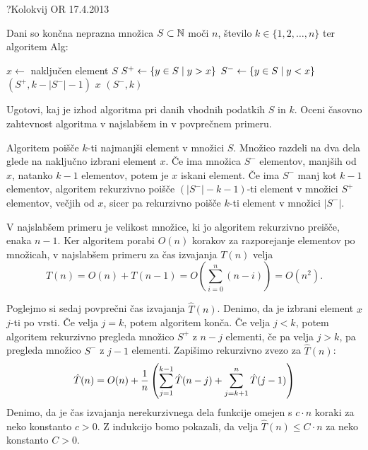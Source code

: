 \begin{naloga}{?}{Kolokvij OR 17.4.2013}
\begin{vprasanje}
Dani so končna neprazna množica $S \subset \mathbb{N}$ moči $n$,
število $k \in \{1, 2, \dots, n\}$ ter algoritem {\sc Alg}:
\begin{small}
\begin{algorithmic}
    \State $x \gets$ naključen element $S$
    \State $S^+ \gets \left\{ y \in S \; \middle| \; y > x \right\}$
    \State $S^- \gets \left\{ y \in S \; \middle| \; y < x \right\}$
        \State {}$(S^+, k - |S^-| - 1)$
        \State \Return $x$
    \Else
        \State {}$(S^-, k)$
    \EndIf
\EndFunction
\end{algorithmic}
\end{small}
Ugotovi, kaj je izhod algoritma pri danih vhodnih podatkih $S$ in $k$.
Oceni časovno zahtevnost algoritma v najslabšem in v povprečnem primeru.
\end{vprasanje}

\begin{odgovor}
Algoritem poišče $k$-ti najmanjši element v množici $S$.
Množico razdeli na dva dela glede na naključno izbrani element $x$.
Če ima množica $S^-$ elementov, manjših od $x$, natanko $k-1$ elementov,
potem je $x$ iskani element.
Če ima $S^-$ manj kot $k-1$ elementov,
algoritem rekurzivno poišče $(|S^-| - k - 1)$-ti element
v množici $S^+$ elementov, večjih od $x$,
sicer pa rekurzivno poišče $k$-ti element v množici $|S^-|$.

V najslabšem primeru je velikost množice,
ki jo algoritem rekurzivno preišče, enaka $n - 1$.
Ker algoritem porabi $O(n)$ korakov za razporejanje elementov po množicah,
v najslabšem primeru za čas izvajanja $T(n)$ velja
$$
T(n) = O(n) + T(n-1) = O\left(\sum_{i=0}^n (n-i)\right) = O(n^2).
$$

Poglejmo si sedaj povprečni čas izvajanja $\hat{T}(n)$.
Denimo, da je izbrani element $x$ $j$-ti po vrsti.
Če velja $j = k$, potem algoritem konča.
Če velja $j < k$, potem algoritem rekurzivno pregleda
množico $S^+$ z $n-j$ elementi,
če pa velja $j > k$, pa pregleda množico $S^-$ z $j-1$ elementi.
Zapišimo rekurzivno zvezo za $\hat{T}(n)$:
$$
\hat{T}(n) = O(n) +
{1 \over n} \left(\sum_{j=1}^{k-1} \hat{T}(n-j) +
\sum_{j=k+1}^n \hat{T}(j-1) \right)
$$
Denimo, da je čas izvajanja nerekurzivnega dela funkcije
omejen s $c \cdot n$ koraki za neko konstanto $c > 0$.
Z indukcijo bomo pokazali,
da velja $\hat{T}(n) \le C \cdot n$ za neko konstanto $C > 0$.


\end{odgovor}
\end{naloga}

